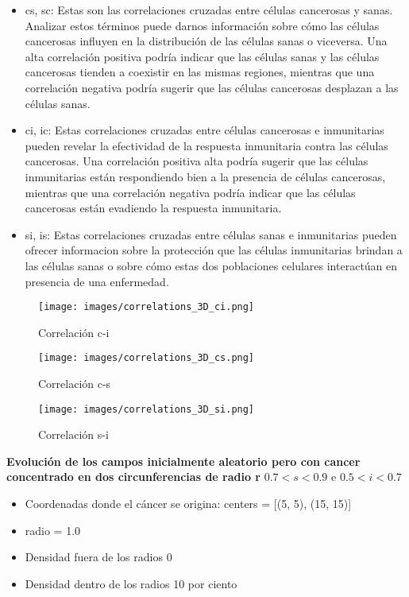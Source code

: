 \documentclass{article}
\begin{document}
\begin{itemize}
    \item cs, sc: Estas son las correlaciones cruzadas entre células cancerosas y sanas. Analizar estos términos puede darnos información sobre cómo las células cancerosas influyen en la distribución de las células sanas o viceversa. Una alta correlación positiva podría indicar que las células sanas y las células cancerosas tienden a coexistir en las mismas regiones, mientras que una correlación negativa podría sugerir que las células cancerosas desplazan a las células sanas.
    \item ci, ic: Estas correlaciones cruzadas entre células cancerosas e inmunitarias pueden revelar la efectividad de la respuesta inmunitaria contra las células cancerosas. Una correlación positiva alta podría sugerir que las células inmunitarias están respondiendo bien a la presencia de células cancerosas, mientras que una correlación negativa podría indicar que las células cancerosas están evadiendo la respuesta inmunitaria.
    \item si, is: Estas correlaciones cruzadas entre células sanas e inmunitarias pueden ofrecer informacion sobre la protección que las células inmunitarias brindan a las células sanas o sobre cómo estas dos poblaciones celulares interactúan en presencia de una enfermedad.
\end{itemize}


\begin{figure}[htbp]
    \centering
    \texttt{[image: images/correlations\_3D\_ci.png]}
    \caption{Correlación c-i}
\end{figure}

\begin{figure}[htbp]
    \centering
    \texttt{[image: images/correlations\_3D\_cs.png]}
    \caption{Correlación c-s}
\end{figure}


\begin{figure}[htbp]
    \centering
    \texttt{[image: images/correlations\_3D\_si.png]}
    \caption{Correlación s-i}
\end{figure}



\textbf{Evolución de los campos inicialmente aleatorio pero con cancer concentrado en dos circunferencias de radio r} $0.7 < s < 0.9$ e $0.5 < i < 0.7$

\begin{itemize}
    \item Coordenadas donde el cáncer se origina: centers = [(5, 5), (15, 15)] 
    \item  radio = 1.0  
    \item Densidad fuera de los radios 0 
    \item Densidad dentro de los radios 10 por ciento  
\end{itemize}
\end{document}
